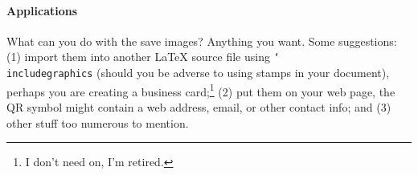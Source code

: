 \documentclass{article}
\def\cs#1{\texttt{\char`\\#1}}
\begin{document}
\paragraph*{Applications} What can you do with the save images? Anything you want. Some suggestions:
(1) import them into another {\LaTeX} source file using \cs{includegraphics}
(should you be adverse to using stamps in your document), perhaps you are
creating a business card;\footnote{I don't need on, I'm retired.} (2) put
them on your web page, the QR symbol might contain a web address, email, or
other contact info; and (3) other stuff too numerous to mention.
\end{document}
